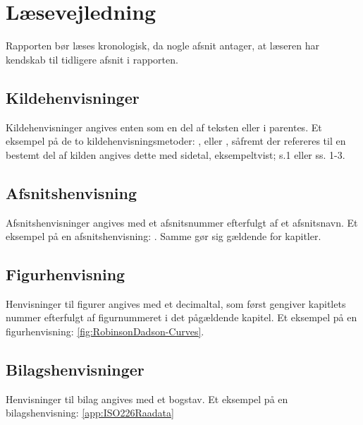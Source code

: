 \section*{Læsevejledning}
\label{Laesevejledning}
Rapporten bør læses kronologisk, da nogle afsnit antager, at læseren har kendskab til tidligere afsnit i rapporten.
\blankline
%
\subsection*{Kildehenvisninger}
Kildehenvisninger angives enten som en del af teksten eller i parentes. Et eksempel på de to kildehenvisningsmetoder: \textcite[s. 1]{EksempelKilde}, eller \parencite[s. 1]{EksempelKilde}, såfremt der refereres til en bestemt del af kilden angives dette med sidetal, eksempeltvist; s.1 eller ss. 1-3.\par
%
\subsection*{Afsnitshenvisning}
Afsnitshenvisninger angives med et afsnitsnummer efterfulgt af et afsnitsnavn. Et eksempel på en afsnitshenvisning: . Samme gør sig gældende for kapitler.
%
\subsection*{Figurhenvisning}
Henvisninger til figurer angives med et decimaltal, som først gengiver kapitlets nummer efterfulgt af figurnummeret i det pågældende kapitel. Et eksempel på en figurhenvisning: \autoref{fig:RobinsonDadson-Curves}.
%
\subsection*{Bilagshenvisninger}
Henvisninger til bilag angives med et bogstav. Et eksempel på en bilagshenvisning: \autoref{app:ISO226Raadata}
%
